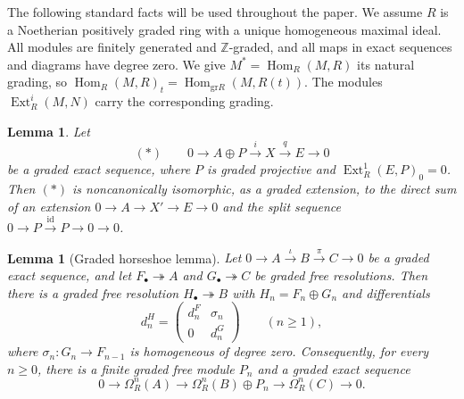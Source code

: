 \documentclass[11pt,letterpaper]{amsart}
\theoremstyle{plain}
\newtheorem{lem}[thm]{Lemma}
\theoremstyle{definition}
\theoremstyle{remark}
\begin{document}
The following standard facts will be used throughout the paper. We assume $R$ is a Noetherian positively graded ring with a unique homogeneous maximal ideal. All modules
are finitely generated and $\mathbb Z$-graded, and all maps in exact sequences
and diagrams have degree zero. We give
$M^*=\operatorname{Hom}_R(M,R)$ its natural grading, so
$\operatorname{Hom}_R(M,R)_t=\operatorname{Hom}_{\mathrm{gr}R}(M,R(t))$.
The modules $\operatorname{Ext}^i_R(M,N)$ carry the corresponding grading.

\begin{lem}\label{split}
Let
\[
 (*)\qquad 0\longrightarrow A\oplus P\xrightarrow{i}X\xrightarrow{q}E
 \longrightarrow0
\]
be a graded exact sequence, where $P$ is graded projective and
$\operatorname{Ext}^1_R(E,P)_0=0$. %
Then $(*)$ is noncanonically isomorphic, as a graded extension,
to the direct sum of an extension $0\to A\to X'\to E\to0$ and the split
sequence $0\to P\xrightarrow{\mathrm{id}}P\to0\to0$.
\end{lem}

\begin{lem}[Graded horseshoe lemma]
Let $0\to A\xrightarrow{\iota}B\xrightarrow{\pi}C\to0$ be a graded exact
sequence, and let $F_\bullet\twoheadrightarrow A$ and
$G_\bullet\twoheadrightarrow C$ be graded free resolutions. Then there is
a graded free resolution $H_\bullet\twoheadrightarrow B$ with
$H_n=F_n\oplus G_n$ and differentials
\[
d_n^H=\begin{pmatrix}d_n^F&\sigma_n\\0&d_n^G\end{pmatrix}
\qquad(n\geq1),
\]
where $\sigma_n:G_n\to F_{n-1}$ is homogeneous of degree zero.
Consequently, for every $n\geq0$, there is a finite graded free module
$P_n$ and a graded exact sequence
\[
0\longrightarrow\Omega_R^n(A)\longrightarrow
\Omega_R^n(B)\oplus P_n\longrightarrow\Omega_R^n(C)
\longrightarrow0.
\]
\end{lem}
\end{document}
